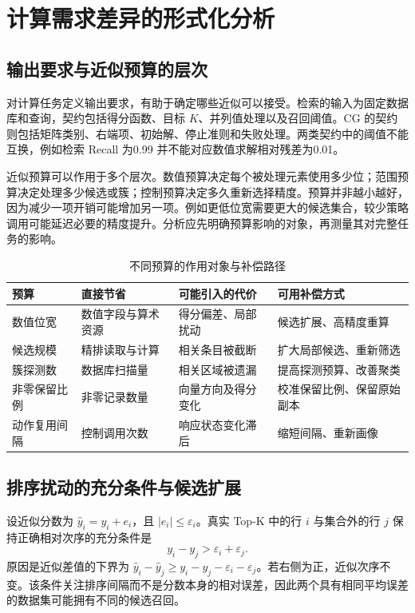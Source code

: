 \section{计算需求差异的形式化分析}
\subsection{输出要求与近似预算的层次}
对计算任务定义输出要求，有助于确定哪些近似可以接受。检索的输入为固定数据库和查询，契约包括得分函数、目标 $K$、并列值处理以及召回阈值。CG 的契约则包括矩阵类别、右端项、初始解、停止准则和失败处理。两类契约中的阈值不能互换，例如检索 Recall 为0.99 并不能对应数值求解相对残差为0.01。

近似预算可以作用于多个层次。数值预算决定每个被处理元素使用多少位；范围预算决定处理多少候选或簇；控制预算决定多久重新选择精度。预算并非越小越好，因为减少一项开销可能增加另一项。例如更低位宽需要更大的候选集合，较少策略调用可能延迟必要的精度提升。分析应先明确预算影响的对象，再测量其对完整任务的影响。

\begin{table}[htbp]\centering\caption{不同预算的作用对象与补偿路径}
\begin{tabularx}{\textwidth}{p{2.2cm}XXX}\toprule
预算&直接节省&可能引入的代价&可用补偿方式\\\midrule
数值位宽&数值字段与算术资源&得分偏差、局部扰动&候选扩展、高精度重算\\
候选规模&精排读取与计算&相关条目被截断&扩大局部候选、重新筛选\\
簇探测数&数据库扫描量&相关区域被遗漏&提高探测预算、改善聚类\\
非零保留比例&非零记录数量&向量方向及得分变化&校准保留比例、保留原始副本\\
动作复用间隔&控制调用次数&响应状态变化滞后&缩短间隔、重新画像\\\bottomrule
\end{tabularx}\end{table}

\subsection{排序扰动的充分条件与候选扩展}
设近似分数为 $\hat y_i=y_i+e_i$，且 $|e_i|\leq\varepsilon_i$。真实 Top-K 中的行 $i$ 与集合外的行 $j$ 保持正确相对次序的充分条件是
\begin{equation}
 y_i-y_j>\varepsilon_i+\varepsilon_j.
\end{equation}
原因是近似差值的下界为 $\hat y_i-\hat y_j\geq y_i-y_j-\varepsilon_i-\varepsilon_j$。若右侧为正，近似次序不变。该条件关注排序间隔而不是分数本身的相对误差，因此两个具有相同平均误差的数据集可能拥有不同的候选召回。

